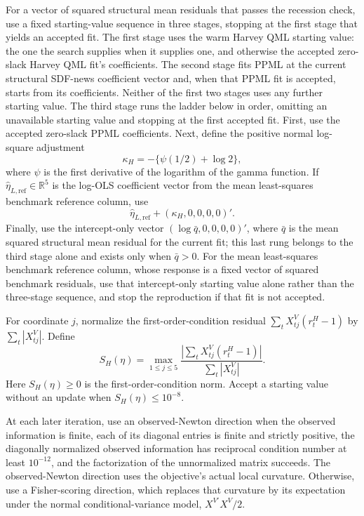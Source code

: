 \documentclass[11pt]{article}
\begin{document}
For a vector of squared structural mean residuals that passes the recession check, use a fixed
starting-value sequence in three stages, stopping at the first stage that yields an accepted fit.
The first stage uses the warm Harvey QML starting value: the one the search supplies when it
supplies one, and otherwise the accepted zero-slack Harvey QML fit's coefficients. The second stage
fits PPML at the current structural SDF-news coefficient vector and, when that PPML fit is accepted,
starts from its coefficients. Neither of the first two stages uses any further starting value. The
third stage runs the ladder below in order, omitting an unavailable starting value and stopping at
the first accepted fit. First, use the accepted zero-slack PPML coefficients. Next, define the positive
normal log-square adjustment
\begin{equation*}
 \kappa_H=-\{\psi(1/2)+\log2\},
\end{equation*}
where \(\psi\) is the first derivative of the logarithm of the gamma function. If
\(\widehat\eta_{L,\mathrm{ref}}\in\mathbb R^5\) is the log-OLS coefficient vector from the
mean least-squares benchmark reference column, use
\begin{equation*}
 \widehat\eta_{L,\mathrm{ref}}+(\kappa_H,0,0,0,0)'.
\end{equation*}
Finally, use the intercept-only vector
\((\log\bar q,0,0,0,0)'\), where \(\bar q\) is the mean squared structural mean residual for the
current fit; this last rung belongs to the third stage alone and exists only when \(\bar q>0\). For
the mean least-squares benchmark reference column, whose response is a fixed vector of squared
benchmark residuals, use that intercept-only starting value alone rather than the three-stage
sequence, and stop the reproduction if that fit is not accepted.

For coordinate \(j\), normalize the first-order-condition residual
\(\sum_tX_{tj}^V(r_t^H-1)\) by \(\sum_t|X_{tj}^V|\). Define
\begin{equation*}
 S_H(\eta)=\max_{1\le j\le5}
 \frac{\left|\sum_tX_{tj}^V(r_t^H-1)\right|}{\sum_t|X_{tj}^V|}.
\end{equation*}
Here \(S_H(\eta)\ge0\) is the first-order-condition norm. Accept a starting value without an
update when \(S_H(\eta)\le10^{-8}\).

At each later iteration, use an observed-Newton direction when the observed information is finite,
each of its diagonal entries is finite and strictly positive, the diagonally normalized observed
information has reciprocal condition number at least \(10^{-12}\), and the factorization of the
unnormalized matrix succeeds. The observed-Newton direction
uses the objective's actual local curvature. Otherwise, use a Fisher-scoring direction, which
replaces that curvature by its expectation under the normal conditional-variance model,
\(X^{V\prime}X^V/2\).
\end{document}
